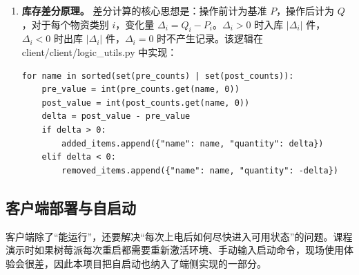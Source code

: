 \documentclass[12pt]{article}
\newcommand{\code}[1]{{\ttfamily #1}}
\begin{document}
\begin{enumerate}
	      UI 层不直接处理识别细节，只负责把三个按钮事件交给 \code{LogicNode}：

	      \begin{lstlisting}[caption={客户端状态机核心入口},label={lst:logic-state}]
def start_operation():
    reset workflow data
    state = "recognizing_face"

def capture_material_now():
    require state == "waiting_camera_move"
    capture material snapshot as "pre"

def finish_operation():
    require state == "waiting_finish"
    record finish time
    capture material snapshot as "post"
\end{lstlisting}

	\item \textbf{库存差分原理。} 差分计算的核心思想是：操作前计为基准 $P$，操作后计为 $Q$，对于每个物资类别 $i$，变化量 $\Delta_i = Q_i - P_i$。$\Delta_i > 0$ 时入库 $|\Delta_i|$ 件，$\Delta_i < 0$ 时出库 $|\Delta_i|$ 件，$\Delta_i = 0$ 时不产生记录。该逻辑在 \code{client/client/logic\_utils.py} 中实现：

	      \begin{lstlisting}[caption={库存差分逻辑},label={lst:inventory-diff}]
for name in sorted(set(pre_counts) | set(post_counts)):
    pre_value = int(pre_counts.get(name, 0))
    post_value = int(post_counts.get(name, 0))
    delta = post_value - pre_value
    if delta > 0:
        added_items.append({"name": name, "quantity": delta})
    elif delta < 0:
        removed_items.append({"name": name, "quantity": -delta})
	\end{lstlisting}
\end{enumerate}

\subsection{客户端部署与自启动}

客户端除了“能运行”，还要解决“每次上电后如何尽快进入可用状态”的问题。课程演示时如果树莓派每次重启都需要重新激活环境、手动输入启动命令，现场使用体验会很差，因此本项目把自启动也纳入了端侧实现的一部分。
\end{document}
